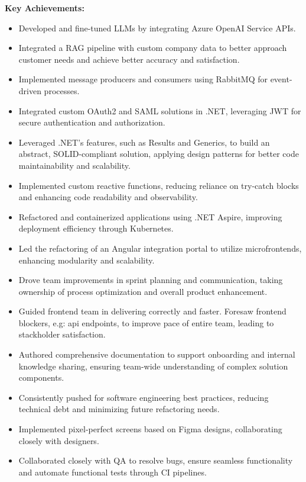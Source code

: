 \documentclass[10pt,a4paper]{altacv}
\begin{document}
\textbf{Key Achievements:} 
\begin{itemize} 
\setlength{\itemindent}{0.5em} 
\item[--] Developed and fine-tuned LLMs by integrating Azure OpenAI Service APIs.
\item[--] Integrated a RAG pipeline with custom company data to better approach customer needs and achieve better accuracy and satisfaction.
\item[--] Implemented message producers and consumers using RabbitMQ for event-driven processes. 
\item[--] Integrated custom OAuth2 and SAML solutions in .NET, leveraging JWT for secure authentication and authorization. 
\item[--] Leveraged .NET’s features, such as Results and Generics, to build an abstract, SOLID-compliant solution, applying design patterns for better code maintainability and scalability. 
\item[--] Implemented custom reactive functions, reducing reliance on try-catch blocks and enhancing code readability and observability.
\item[--] Refactored and containerized applications using .NET Aspire, improving deployment efficiency through Kubernetes.
\item[--] Led the refactoring of an Angular integration portal to utilize microfrontends, enhancing modularity and scalability.
\item[--] Drove team improvements in sprint planning and communication, taking ownership of process optimization and overall product enhancement.
\item[--] Guided frontend team in delivering correctly and faster. Foresaw frontend blockers, e.g: api endpoints, to improve pace of entire team, leading to stackholder satisfaction.
\item[--] Authored comprehensive documentation to support onboarding and internal knowledge sharing, ensuring team-wide understanding of complex solution components.
\item[--] Consistently pushed for software engineering best practices, reducing technical debt and minimizing future refactoring needs.
\item[--] Implemented pixel-perfect screens based on Figma designs, collaborating closely with designers.
\item[--] Collaborated closely with QA to resolve bugs, ensure seamless functionality and automate functional tests through CI pipelines.
\end{itemize}
\end{document}
